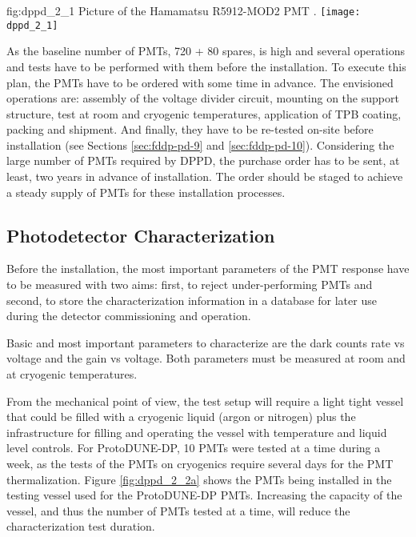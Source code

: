 \begin{dunefigure}{fig:dppd_2_1}
{Picture of the Hamamatsu R5912-MOD2 PMT \cite{hamamatsu-5912}.}
\texttt{[image: dppd\_2\_1]}
\end{dunefigure}

As the baseline number of PMTs, 720 + 80 spares, is high and several operations and tests have to be performed with them before the installation. To execute this plan, the PMTs have to be ordered with some time in advance. The envisioned operations are: assembly of the voltage divider circuit, mounting on the support structure, test at room and cryogenic temperatures, application of TPB coating, packing and shipment. And finally, they have to be re-tested on-site before installation (see Sections \ref{sec:fddp-pd-9} and \ref{sec:fddp-pd-10}). Considering the large number of PMTs required by DPPD, the purchase order has to be sent, at least, two years in advance of installation. The order should be staged to achieve a steady supply of PMTs for these installation processes. 

\subsection{Photodetector Characterization}
\label{sec:fddp-pd-2.2}

Before the installation, the most important parameters of the PMT response have to be measured with two aims: first, to reject under-performing PMTs and second, to store the characterization information in a database for later use during the detector commissioning and operation.

Basic and most important parameters to characterize are the dark counts rate vs voltage and the gain vs voltage. Both parameters must be measured at room and at cryogenic temperatures.

From the mechanical point of view, the test setup will require a light tight vessel that could be filled with a cryogenic liquid (argon or nitrogen) plus the infrastructure for filling and operating the vessel with temperature and liquid level controls. For ProtoDUNE-DP, 10 PMTs were tested at a time during a week, as the tests of the PMTs on cryogenics require several days for the PMT thermalization. Figure \ref{fig:dppd_2_2a} shows the PMTs being installed in the testing vessel used for the ProtoDUNE-DP PMTs. Increasing the capacity of the vessel, and thus the number of PMTs tested at a time, will reduce the characterization test duration.

